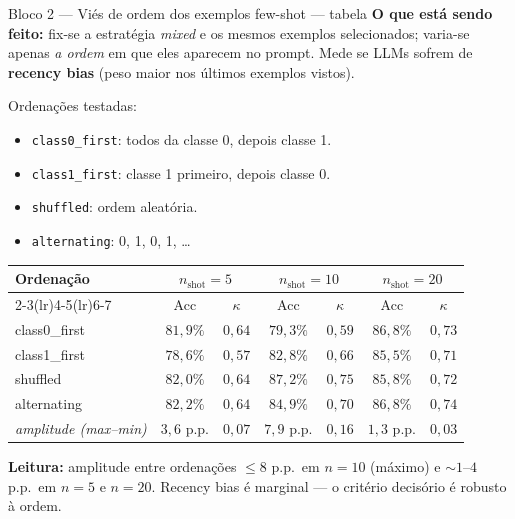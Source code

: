 \documentclass[aspectratio=169,10pt]{beamer}
\begin{document}
\begin{frame}{Bloco 2 --- Vi\'es de ordem dos exemplos few-shot --- tabela}
  \scriptsize
  \textbf{O que est\'a sendo feito:} fix-se a estrat\'egia \emph{mixed} e os mesmos exemplos selecionados; varia-se apenas \emph{a ordem} em que eles aparecem no prompt. Mede se LLMs sofrem de \textbf{recency bias} (peso maior nos \'ultimos exemplos vistos).

  Ordena\c{c}\~oes testadas:
  \begin{itemize}\setlength\itemsep{0.05em}
    \item \texttt{class0\_first}: todos da classe 0, depois classe 1.
    \item \texttt{class1\_first}: classe 1 primeiro, depois classe 0.
    \item \texttt{shuffled}: ordem aleat\'oria.
    \item \texttt{alternating}: 0, 1, 0, 1, \ldots
  \end{itemize}
  \begin{center}
  \begin{tabular}{lcccccc}
    \toprule
    Ordena\c{c}\~ao & \multicolumn{2}{c}{$n_{\text{shot}}=5$} & \multicolumn{2}{c}{$n_{\text{shot}}=10$} & \multicolumn{2}{c}{$n_{\text{shot}}=20$} \\
    \cmidrule(lr){2-3}\cmidrule(lr){4-5}\cmidrule(lr){6-7}
                 & Acc & $\kappa$ & Acc & $\kappa$ & Acc & $\kappa$ \\
    \midrule
    class0\_first & $81{,}9\%$ & $0{,}64$ & $79{,}3\%$ & $0{,}59$ & $86{,}8\%$ & $0{,}73$ \\
    class1\_first & $78{,}6\%$ & $0{,}57$ & $82{,}8\%$ & $0{,}66$ & $85{,}5\%$ & $0{,}71$ \\
    shuffled     & $82{,}0\%$ & $0{,}64$ & \textbf{$87{,}2\%$} & \textbf{$0{,}75$} & $85{,}8\%$ & $0{,}72$ \\
    alternating  & $82{,}2\%$ & $0{,}64$ & $84{,}9\%$ & $0{,}70$ & $86{,}8\%$ & $0{,}74$ \\
    \midrule
    \textit{amplitude (max--min)} & $3{,}6$ p.p. & $0{,}07$ & $7{,}9$ p.p. & $0{,}16$ & $1{,}3$ p.p. & $0{,}03$ \\
    \bottomrule
  \end{tabular}
  \end{center}
  \tiny
  \textbf{Leitura:} amplitude entre ordena\c{c}\~oes $\leq 8$ p.p.\ em $n=10$ (m\'aximo) e $\sim 1$--$4$ p.p.\ em $n=5$ e $n=20$. Recency bias \'e marginal --- o crit\'erio decis\'orio \'e robusto \`a ordem.
\end{frame}
\end{document}
